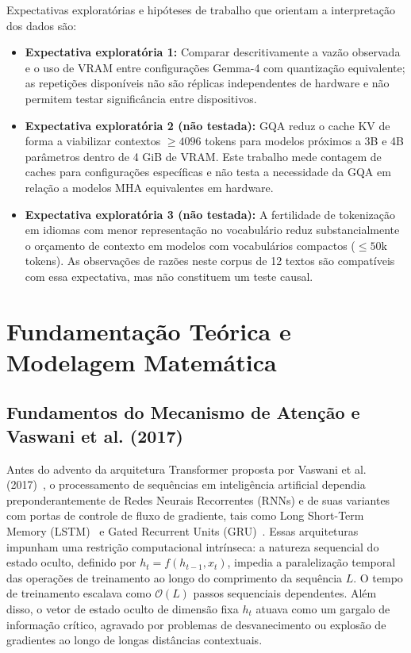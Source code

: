 \documentclass[10pt,a4paper,twocolumn]{article}
\begin{document}
Expectativas explorat\'orias e hip\'oteses de trabalho que orientam a interpreta\c{c}\~ao dos dados s\~ao:
\begin{itemize}[leftmargin=2em,itemsep=0.2em]
    \item \textbf{Expectativa explorat\'oria 1:} Comparar descritivamente a vaz\~ao observada e o uso de VRAM entre configura\c{c}\~oes Gemma-4 com quantiza\c{c}\~ao equivalente; as repeti\c{c}\~oes dispon\'iveis n\~ao s\~ao r\'eplicas independentes de hardware e n\~ao permitem testar signific\^ancia entre dispositivos.
    \item \textbf{Expectativa explorat\'oria 2 (n\~ao testada):} GQA reduz o cache KV de forma a viabilizar contextos $\ge 4096$ tokens para modelos pr\'oximos a 3B e 4B par\^ametros dentro de 4 GiB de VRAM. Este trabalho mede contagem de caches para configura\c{c}\~oes espec\'ificas e n\~ao testa a necessidade da GQA em rela\c{c}\~ao a modelos MHA equivalentes em hardware.
    \item \textbf{Expectativa explorat\'oria 3 (n\~ao testada):} A fertilidade de tokeniza\c{c}\~ao em idiomas com menor representa\c{c}\~ao no vocabul\'ario reduz substancialmente o or\c{c}amento de contexto em modelos com vocabul\'arios compactos ($\le 50\text{k}$ tokens). As observa\c{c}\~oes de raz\~oes neste corpus de 12 textos s\~ao compat\'iveis com essa expectativa, mas n\~ao constituem um teste causal.
\end{itemize}

\section{Fundamenta\c{c}\~ao Te\'orica e Modelagem Matem\'atica}

\subsection{Fundamentos do Mecanismo de Aten\c{c}\~ao e Vaswani et al. (2017)}

Antes do advento da arquitetura Transformer proposta por Vaswani et al. (2017)~\cite{vaswani2017}, o processamento de sequ\^encias em intelig\^encia artificial dependia preponderantemente de Redes Neurais Recorrentes (RNNs) e de suas variantes com portas de controle de fluxo de gradiente, tais como Long Short-Term Memory (LSTM)~\cite{hochreiter1997} e Gated Recurrent Units (GRU)~\cite{cho2014}. Essas arquiteturas impunham uma restri\c{c}\~ao computacional intr\'inseca: a natureza sequencial do estado oculto, definido por $h_t = f(h_{t-1}, x_t)$, impedia a paraleliza\c{c}\~ao temporal das opera\c{c}\~oes de treinamento ao longo do comprimento da sequ\^encia $L$. O tempo de treinamento escalava como $\mathcal{O}(L)$ passos sequenciais dependentes. Al\'em disso, o vetor de estado oculto de dimens\~ao fixa $h_t$ atuava como um gargalo de informa\c{c}\~ao cr\'itico, agravado por problemas de desvanecimento ou explos\~ao de gradientes ao longo de longas dist\^ancias contextuais.
\end{document}
